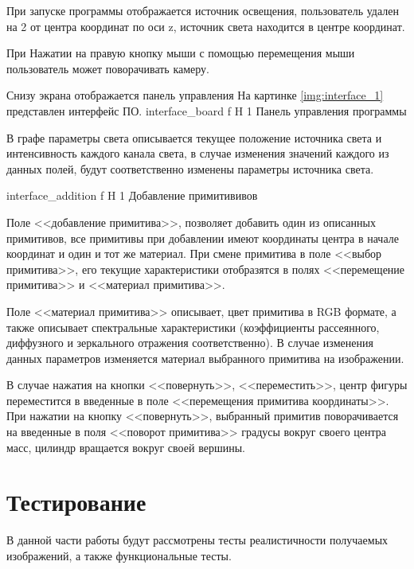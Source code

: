 При запуске программы отображается источник освещения, пользователь удален на 2 от центра координат по оси z, источник света находится в центре координат. 

При Нажатии на правую кнопку мыши с помощью перемещения мыши пользователь может поворачивать камеру.

Снизу экрана отображается панель управления 
На картинке \ref{img:interface_1} представлен интерфейс ПО.
{interface_board} %
{f} %
{H} %
{1\textwidth} %
{Панель управления программы} %

В графе параметры света описывается текущее положение источника света
и интенсивность каждого канала света, в случае изменения значений каждого из данных полей, будут соответственно изменены параметры источника света.

{interface_addition} %
{f} %
{H} %
{1\textwidth} %
{Добавление примитививов} %

Поле <<добавление примитива>>, позволяет добавить один из описанных примитивов, все примитивы при добавлении имеют координаты центра в начале координат и один и тот же материал.
При смене примитива в поле <<выбор примитива>>, его текущие характеристики отобразятся в полях <<перемещение примитива>>  и <<материал примитива>>.

Поле <<материал примитива>> описывает, цвет примитива в RGB формате,
а также описывает спектральные характеристики (коэффициенты рассеянного, диффузного и зеркального отражения соответственно).
В случае изменения данных параметров изменяется материал выбранного примитива на изображении.

В случае нажатия  на кнопки <<повернуть>>, <<переместить>>,
центр фигуры переместится в введенные в поле <<перемещения примитива координаты>>. При нажатии на кнопку <<повернуть>>, выбранный примитив
поворачивается на введенные в поля <<поворот примитива>> градусы вокруг своего центра масс, цилиндр вращается вокруг своей вершины.

\section{Тестирование}
В данной части работы будут рассмотрены тесты реалистичности получаемых изображений, а также функциональные тесты.


